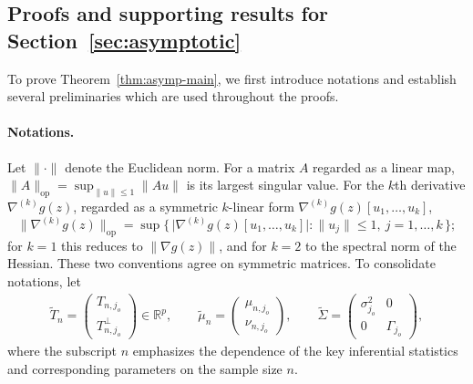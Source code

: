 \documentclass[12pt]{article}
\newcommand{\op}{\mathrm{op}}
\newcommand{\real}{\mathbb{R}}
\begin{document}
\begin{appendices}
\section{Proofs and supporting results for Section~\ref{sec:asymptotic}}
\label{app:asymp}


To prove Theorem~\ref{thm:asymp-main}, we first introduce notations and establish several preliminaries which are used throughout the proofs. 


\paragraph{Notations.} Let $\|\cdot\|$ denote the Euclidean norm. For a matrix $A$ regarded as a linear
map, $\|A\|_{\op}=\sup_{\|u\|\le 1}\|Au\|$ is its largest singular value. For the
$k$th derivative $\nabla^{(k)}g(z)$, regarded as a symmetric $k$-linear form $\nabla^{(k)}g(z)[u_1,\dots,u_k]$,
\[
  \big\|\nabla^{(k)}g(z)\big\|_{\op}
   =\sup\Big\{\,\big|\nabla^{(k)}g(z)[u_1,\dots,u_k]\big| : \|u_j\|\le 1,\ j=1,\dots,k\,\Big\};
\]
for $k=1$ this reduces to $\|\nabla g(z)\|$, and for $k=2$ to the spectral norm of
the Hessian. These two conventions agree on symmetric matrices. To consolidate notations, let
\begin{align}
\label{eq:scaled}
  \widetilde T_n
  =\begin{pmatrix}T_{n,j_o}\\T_{n,j_o}^\perp\end{pmatrix}
  \in\real^p,
  \qquad
  \widetilde\mu_n
  =\begin{pmatrix}\mu_{n,j_o}\\\nu_{n,j_o}\end{pmatrix},
  \qquad
  \widetilde\Sigma
  =\begin{pmatrix}\sigma_{j_o}^2 & 0\\0 & \Gamma_{j_o}\end{pmatrix},
\end{align}
where the subscript $n$ emphasizes the dependence of the key inferential statistics and corresponding parameters on the sample size $n$.


\end{appendices}
\end{document}
